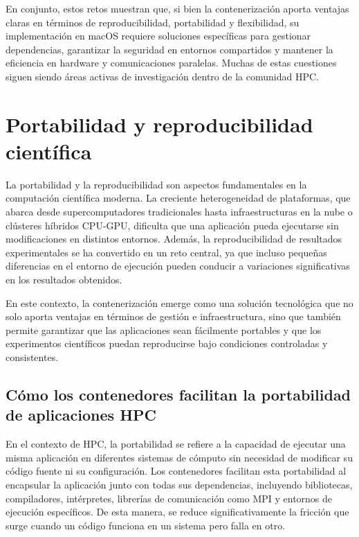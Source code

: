 En conjunto, estos retos muestran que, si bien la contenerización aporta ventajas claras en términos de reproducibilidad, portabilidad y flexibilidad, su implementación en macOS requiere soluciones específicas para gestionar dependencias, garantizar la seguridad en entornos compartidos y mantener la eficiencia en hardware y comunicaciones paralelas. Muchas de estas cuestiones siguen siendo áreas activas de investigación dentro de la comunidad \acs{HPC}.

\section{Portabilidad y reproducibilidad científica}\label{sec:portabilidad_reproducibilidad}

La portabilidad y la reproducibilidad son aspectos fundamentales en la computación científica moderna. La creciente heterogeneidad de plataformas, que abarca desde supercomputadores tradicionales hasta infraestructuras en la nube o clústeres híbridos CPU-GPU, dificulta que una aplicación pueda ejecutarse sin modificaciones en distintos entornos. Además, la reproducibilidad de resultados experimentales se ha convertido en un reto central, ya que incluso pequeñas diferencias en el entorno de ejecución pueden conducir a variaciones significativas en los resultados obtenidos.

En este contexto, la contenerización emerge como una solución tecnológica que no solo aporta ventajas en términos de gestión e infraestructura, sino que también permite garantizar que las aplicaciones sean fácilmente portables y que los experimentos científicos puedan reproducirse bajo condiciones controladas y consistentes.

\subsection{Cómo los contenedores facilitan la portabilidad de aplicaciones \acs{HPC}}

En el contexto de \acs{HPC}, la portabilidad se refiere a la capacidad de ejecutar una misma aplicación en diferentes sistemas de cómputo sin necesidad de modificar su código fuente ni su configuración. Los contenedores facilitan esta portabilidad al encapsular la aplicación junto con todas sus dependencias, incluyendo bibliotecas, compiladores, intérpretes, librerías de comunicación como MPI y entornos de ejecución específicos. De esta manera, se reduce significativamente la fricción que surge cuando un código funciona en un sistema pero falla en otro.

